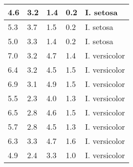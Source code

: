 \begin{appendices}
\begin{center}
\begin{tabular}{|p{2cm}|p{2cm}|p{2cm}|p{2cm}|p{2cm}|}
\hline
4.6	& 3.2 & 1.4	& 0.2 & I. setosa\\
\hline
5.3	& 3.7 & 1.5	& 0.2 & I. setosa\\
\hline
5.0	& 3.3 & 1.4	& 0.2 & I. setosa\\
\hline
7.0	& 3.2 & 4.7	& 1.4 & I. versicolor\\
\hline
6.4	& 3.2 & 4.5	& 1.5 & I. versicolor\\
\hline
6.9	& 3.1 & 4.9	& 1.5 & I. versicolor\\
\hline
5.5	& 2.3 & 4.0	& 1.3 & I. versicolor\\
\hline
6.5	& 2.8 & 4.6	& 1.5 & I. versicolor\\
\hline
5.7	& 2.8 & 4.5	& 1.3 & I. versicolor\\
\hline
6.3	& 3.3 & 4.7	& 1.6 & I. versicolor\\
\hline
4.9	& 2.4 & 3.3	& 1.0 & I. versicolor\\
\hline
\end{tabular}
\end{center}


\end{appendices}
